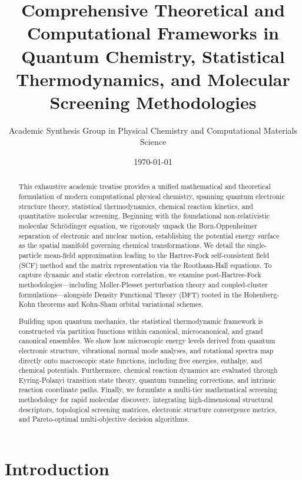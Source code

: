 \documentclass[12pt]{article}
\title{Comprehensive Theoretical and Computational Frameworks in Quantum Chemistry, Statistical Thermodynamics, and Molecular Screening Methodologies}
\author{Academic Synthesis Group in Physical Chemistry and Computational Materials Science}
\date{\today}
\begin{document}
\maketitle

\begin{abstract}
This exhaustive academic treatise provides a unified mathematical and theoretical formulation of modern computational physical chemistry, spanning quantum electronic structure theory, statistical thermodynamics, chemical reaction kinetics, and quantitative molecular screening. Beginning with the foundational non-relativistic molecular Schrödinger equation, we rigorously unpack the Born-Oppenheimer separation of electronic and nuclear motion, establishing the potential energy surface as the spatial manifold governing chemical transformations. We detail the single-particle mean-field approximation leading to the Hartree-Fock self-consistent field (SCF) method and the matrix representation via the Roothaan-Hall equations. To capture dynamic and static electron correlation, we examine post-Hartree-Fock methodologies—including M{\o}ller-Plesset perturbation theory and coupled-cluster formulations—alongside Density Functional Theory (DFT) rooted in the Hohenberg-Kohn theorems and Kohn-Sham orbital variational schemes.

Building upon quantum mechanics, the statistical thermodynamic framework is constructed via partition functions within canonical, microcanonical, and grand canonical ensembles. We show how microscopic energy levels derived from quantum electronic structure, vibrational normal mode analyses, and rotational spectra map directly onto macroscopic state functions, including free energies, enthalpy, and chemical potentials. Furthermore, chemical reaction dynamics are evaluated through Eyring-Polanyi transition state theory, quantum tunneling corrections, and intrinsic reaction coordinate paths. Finally, we formulate a multi-tier mathematical screening methodology for rapid molecular discovery, integrating high-dimensional structural descriptors, topological screening matrices, electronic structure convergence metrics, and Pareto-optimal multi-objective decision algorithms.
\end{abstract}

\section{Introduction}
\end{document}
